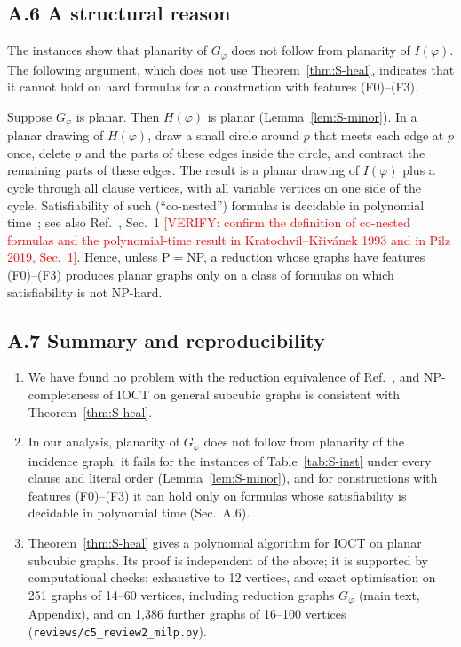 \documentclass[aps,pre,onecolumn,superscriptaddress,nofootinbib]{revtex4-2}
\theoremstyle{remark}
\newcommand{\verify}[1]{\textcolor{red}{[VERIFY: #1]}}
\begin{document}
\subsection*{A.6 A structural reason}

The instances show that planarity of $G_\varphi$ does not follow from planarity of $I(\varphi)$.
The following argument, which does not use Theorem~\ref{thm:S-heal}, indicates that it cannot hold
on hard formulas for a construction with features (F0)--(F3).

Suppose $G_\varphi$ is planar. Then $H(\varphi)$ is planar (Lemma~\ref{lem:S-minor}). In a planar
drawing of $H(\varphi)$, draw a small circle around $p$ that meets each edge at $p$ once, delete $p$
and the parts of these edges inside the circle, and contract the remaining parts of these edges.
The result is a planar drawing of $I(\varphi)$ plus a cycle through all clause vertices, with all
variable vertices on one side of the cycle. Satisfiability of such (``co-nested'') formulas is
decidable in polynomial time~\cite{KratochvilKrivanek1993}; see also Ref.~\cite{Pilz2019}, Sec.~1
\verify{confirm the definition of co-nested formulas and the polynomial-time result in
Kratochv\'il--K\v{r}iv\'anek 1993 and in Pilz 2019, Sec.~1}. Hence, unless P${}={}$NP, a reduction
whose graphs have features (F0)--(F3) produces planar graphs only on a class of formulas on which
satisfiability is not NP-hard.

\subsection*{A.7 Summary and reproducibility}

\begin{enumerate}
\item We have found no problem with the reduction equivalence of Ref.~\cite{Johnson2025}, and
NP-completeness of IOCT on general subcubic graphs is consistent with Theorem~\ref{thm:S-heal}.
\item In our analysis, planarity of $G_\varphi$ does not follow from planarity of the incidence
graph: it fails for the instances of Table~\ref{tab:S-inst} under every clause and literal order
(Lemma~\ref{lem:S-minor}), and for constructions with features (F0)--(F3) it can hold only on
formulas whose satisfiability is decidable in polynomial time (Sec.~A.6).
\item Theorem~\ref{thm:S-heal} gives a polynomial algorithm for IOCT on planar subcubic graphs. Its
proof is independent of the above; it is supported by computational checks: exhaustive to 12
vertices, and exact optimisation on 251 graphs of 14--60 vertices, including reduction graphs
$G_\varphi$ (main text, Appendix), and on 1,386 further graphs of 16--100 vertices
(\texttt{reviews/c5\_review2\_milp.py}).
\end{enumerate}
\end{document}
